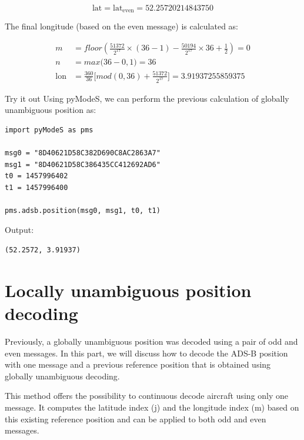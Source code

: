 \begin{equation}
  \mathrm{lat} = \mathrm{lat}_\mathrm{even} = 52.25720214843750
\end{equation}

The final longitude (based on the even message) is calculated as:

\begin{align}
  m &= floor \left( \frac{51372}{2^{17}} \times (36-1) - \frac{50194}{2^{17}} \times 36 + \frac{1}{2}  \right) = 0\\
  n &= max \Big( 36-0, 1 \Big) = 36\\
    \mathrm{lon} &= \frac{360}{36} \Big[ mod(0, 36) + \frac{51372}{2^{17}} \Big] = 3.91937255859375
\end{align}

\begin{notebox}{Try it out}
Using pyModeS, we can perform the previous calculation of globally unambiguous position as: 

\begin{verbatim}
import pyModeS as pms

msg0 = "8D40621D58C382D690C8AC2863A7"
msg1 = "8D40621D58C386435CC412692AD6"
t0 = 1457996402
t1 = 1457996400

pms.adsb.position(msg0, msg1, t0, t1)
\end{verbatim}

Output: 

\begin{verbatim}
(52.2572, 3.91937)
\end{verbatim}

\end{notebox}



\section{Locally unambiguous position decoding}

Previously, a globally unambiguous position was decoded using a pair of odd and even messages. In this part, we will discuss how to decode the ADS-B position with one message and a previous reference position that is obtained using globally unambiguous decoding.

This method offers the possibility to continuous decode aircraft using only one message. It computes the latitude index (j) and the longitude index (m) based on this existing reference position and can be applied to both odd and even messages.


